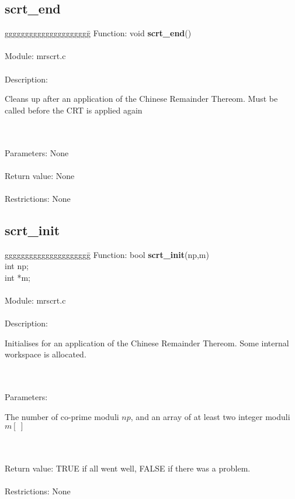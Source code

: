\subsection{scrt\_end}
\begin{tabbing}
ggggggggggggggggggggg\= \kill
      Function:      \>void {\bf scrt\_end}() \\
      \ \\
      Module:        \>mrscrt.c \\
      \ \\
      Description:   \>
                     \parbox[t]{3 in}
                     {Cleans up after an application of the Chinese Remainder
                      Thereom. Must be called before the CRT is applied again} \\
      \ \\
      Parameters:    \>None \\
      \ \\
      Return value:  \>None \\
      \ \\
      Restrictions:  \>None \\
\end{tabbing}
      

\subsection{scrt\_init}
\begin{tabbing}
ggggggggggggggggggggg\= \kill
      Function:      \>bool {\bf scrt\_init}(np,m) \\
                     \>int np; \\
                     \>int *m; \\
      \ \\
      Module:        \>mrscrt.c \\
      \ \\
      Description:   \>
                     \parbox[t]{3 in}
                     {Initialises for an application of the Chinese Remainder
                      Thereom. Some internal workspace is allocated.} \\
      \ \\
      Parameters:    \>
                     \parbox[t]{3 in}
                     {The number of co-prime moduli $np$, and an array of
                      at least two integer moduli $m[\ ]$} \\
      \ \\
      Return value:  \>TRUE if all went well, FALSE if there was a problem. \\
      \ \\
      Restrictions:  \>None \\
\end{tabbing}

